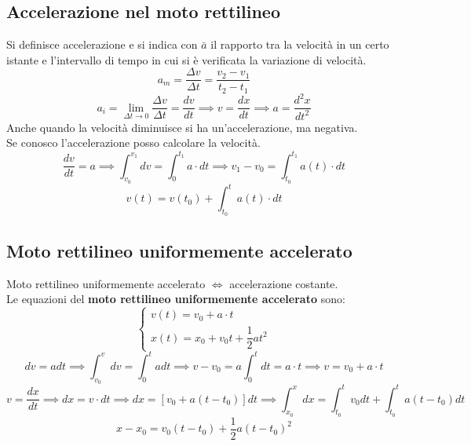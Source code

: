 \documentclass[../../main.tex]{subfiles}
\begin{document}
\subsection{Accelerazione nel moto rettilineo}
Si definisce accelerazione e si indica con $\bar a$ il rapporto tra la velocità in un certo istante e l'intervallo di tempo in cui si è verificata la variazione di velocità.
\[
    a_m = \frac{\Delta v}{\Delta t} = \frac{v_2 - v_1}{t_2 - t_1}
\]
\[
    a_i = \lim_{\Delta t \to 0} \frac{\Delta v}{\Delta t} = \frac{dv}{dt} \implies v = \frac{dx}{dt} \implies a = \frac{d^2x}{dt^2}
\]
Anche quando la velocità diminuisce si ha un'accelerazione, ma negativa.\\
Se conosco l'accelerazione posso calcolare la velocità.
\[
    \dfrac{dv}{dt} = a \implies \int_{v_0}^{v_1} dv = \int_{0}^{t_1} a \cdot dt \implies v_1 - v_0 = \int_{t_0}^{t_1} a(t) \cdot dt
\]
\[
    v(t) = v(t_0) + \int_{t_0}^{t} a(t) \cdot dt
\]
\subsection{Moto rettilineo uniformemente accelerato}
Moto rettilineo uniformemente accelerato $\iff$ accelerazione costante.\\
Le equazioni del \textbf{moto rettilineo uniformemente accelerato} sono:
\[
    \begin{cases}
        v(t) = v_0 + a \cdot t \\
        x(t) = x_0 + v_0t + \dfrac{1}{2}at^2
    \end{cases}
\]
\[
    dv = a dt \implies \int_{v_0}^v dv = \int_{0}^t a dt \implies v - v_0 = a \int_{0}^t dt = a \cdot t \implies v = v_0 + a \cdot t
\]
\[
    v = \dfrac{dx}{dt} \implies dx = v \cdot dt \implies dx = [v_0 + a(t - t_0)]dt \implies \int_{x_0}^x dx = \int_{t_0}^t v_0 dt + \int_{t_0}^t a(t - t_0) dt
\]
\[
    x - x_0 = v_0(t - t_0) + \dfrac{1}{2} a(t - t_0)^2
\]
\end{document}
